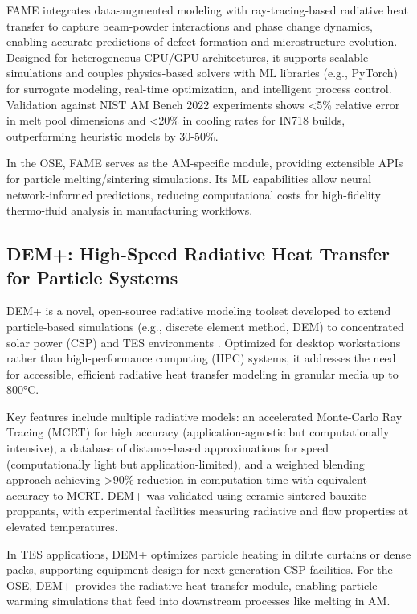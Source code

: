 \documentclass[11pt]{article}
\begin{document}
FAME integrates data-augmented modeling with ray-tracing-based radiative heat transfer to capture beam-powder interactions and phase change dynamics, enabling accurate predictions of defect formation and microstructure evolution. Designed for heterogeneous CPU/GPU architectures, it supports scalable simulations and couples physics-based solvers with ML libraries (e.g., PyTorch) for surrogate modeling, real-time optimization, and intelligent process control. Validation against NIST AM Bench 2022 experiments shows <5\% relative error in melt pool dimensions and <20\% in cooling rates for IN718 builds, outperforming heuristic models by 30-50\%.

In the OSE, FAME serves as the AM-specific module, providing extensible APIs for particle melting/sintering simulations. Its ML capabilities allow neural network-informed predictions, reducing computational costs for high-fidelity thermo-fluid analysis in manufacturing workflows.

\subsection*{DEM+: High-Speed Radiative Heat Transfer for Particle Systems}
DEM+ is a novel, open-source radiative modeling toolset developed to extend particle-based simulations (e.g., discrete element method, DEM) to concentrated solar power (CSP) and TES environments \cite{schraderDevelopmentExperimentalOptimization2024}. Optimized for desktop workstations rather than high-performance computing (HPC) systems, it addresses the need for accessible, efficient radiative heat transfer modeling in granular media up to 800°C.

Key features include multiple radiative models: an accelerated Monte-Carlo Ray Tracing (MCRT) for high accuracy (application-agnostic but computationally intensive), a database of distance-based approximations for speed (computationally light but application-limited), and a weighted blending approach achieving >90\% reduction in computation time with equivalent accuracy to MCRT. DEM+ was validated using ceramic sintered bauxite proppants, with experimental facilities measuring radiative and flow properties at elevated temperatures.

In TES applications, DEM+ optimizes particle heating in dilute curtains or dense packs, supporting equipment design for next-generation CSP facilities. For the OSE, DEM+ provides the radiative heat transfer module, enabling particle warming simulations that feed into downstream processes like melting in AM.
\end{document}
